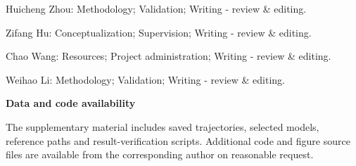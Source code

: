 \documentclass[10pt,a4paper]{article}
\begin{document}
Huicheng Zhou: Methodology; Validation; Writing - review \& editing.

Zifang Hu: Conceptualization; Supervision; Writing - review \& editing.

Chao Wang: Resources; Project administration; Writing - review \& editing.

Weihao Li: Methodology; Validation; Writing - review \& editing.

\textbf{Data and code availability}\par The supplementary material includes saved trajectories, selected models, reference paths and result-verification scripts. Additional code and figure source files are available from the corresponding author on reasonable request.
\end{document}
